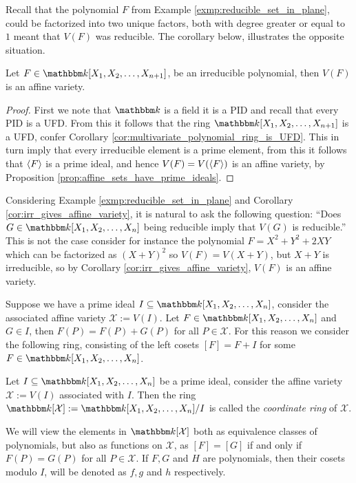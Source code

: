 Recall that the polynomial $F$ from Example \ref{exmp:reducible_set_in_plane}, could be factorized into two unique factors, both with degree greater or equal to $1$ meant that $V(F)$ was reducible. The corollary below, illustrates the opposite situation.
\begin{corollary} \label{cor:irr_gives_affine_variety}
  Let $F \in \K[X_1, X_2, \ldots, X_{n + 1}]$, be an irreducible polynomial, then $V(F)$ is an affine variety.
\end{corollary}
\begin{proof}
  First we note that $\K$ is a field it is a PID and recall that every PID is a UFD. From this it follows that the ring $\K[X_1, X_2, \ldots, X_{n + 1}]$ is a UFD, confer Corollary \ref{cor:multivariate_polynomial_ring_is_UFD}. This in turn imply that every irreducible element is a prime element, from this it follows that $\langle F\rangle$ is a prime ideal, and hence $V(F) = V(\langle F\rangle)$ is an affine variety, by Proposition \ref{prop:affine_sets_have_prime_ideals}.
\end{proof}
Considering Example \ref{exmp:reducible_set_in_plane} and Corollary \ref{cor:irr_gives_affine_variety}, it is natural to ask the following question: ``Does $G \in \K[X_1, X_2, \ldots, X_{n}]$ being reducible imply that $V(G)$ is reducible.'' This is not the case consider for instance the polynomial $F = X^{2} + Y^{2} + 2XY$ which can be factorized as $(X + Y)^{2}$ so $V(F) = V(X + Y)$, but $X + Y$ is irreducible, so by Corollary \ref{cor:irr_gives_affine_variety}, $V(F)$ is an affine variety.

Suppose we have a prime ideal $I \subseteq \K[X_1, X_2, \ldots, X_{n}]$, consider the associated affine variety $\mathcal{X} := V(I)$. Let $F \in \K[X_1, X_2, \ldots, X_{n}]$ and $G \in I$, then $F(P) = F(P) + G(P)$ for all $P \in \mathcal{X}$. For this reason we consider the following ring, consisting of the left cosets $[F] = F + I$ for some $F \in \K[X_1, X_2, \ldots, X_{n}]$.
\begin{definition}\label{def:coordinate_ring_affine}
  Let $I \subseteq \K[X_1, X_2, \ldots, X_{n}]$ be a prime ideal, consider the affine variety $\mathcal{X} := V(I)$ associated with $I$. Then the ring $\K[\mathcal{X}] := \K[X_1, X_2, \ldots, X_{n}] / I$ is called the \textit{coordinate ring} of $\mathcal{X}$.
\end{definition}
We will view the elements in $\K[\mathcal{X}]$ both as equivalence classes of polynomials, but also as functions on $\mathcal{X}$, as $[F] = [G]$ if and only if $F(P) = G(P)$ for all $P \in \mathcal{X}$. If $F, G$ and $H$ are polynomials, then their cosets modulo $I$, will be denoted as $f, g$ and $h$ respectively.

